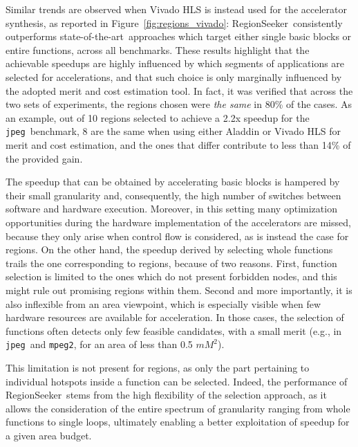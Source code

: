 \documentclass[]{usiinfthesis}
\newcommand{\rseeker}{{RegionSeeker}}
\newcommand{\SoTA}{{state-of-the-art}}
\newcommand{\jpeg}{\texttt{jpeg}}
\newcommand{\mpeg}{\texttt{mpeg2}}
\begin{document}
Similar trends are observed when Vivado HLS is instead used for the
accelerator synthesis, as reported in
Figure~\ref{fig:regions_vivado}: \rseeker\ consistently outperforms
\SoTA\ approaches which target either single basic blocks or
entire functions, across all benchmarks. These results 
highlight that the achievable speedups
are highly influenced by which segments of applications are selected
for accelerations, and that such choice is only marginally influenced
by the adopted merit and cost estimation tool. In fact, it was verified
that across the two sets of experiments, the regions chosen were
\emph{the same} in 80\% of the cases. As an example, out of 10 regions
selected to achieve a 2.2x speedup for the \jpeg\ benchmark, 8 are the
same when using either Aladdin or Vivado HLS for merit and cost
estimation, and the ones that differ contribute to less than 14\% of
the provided gain.\par

The speedup that can be obtained by accelerating basic blocks is
hampered by their small granularity and, consequently, the high number
of switches between software and hardware execution. Moreover, in this
setting many optimization opportunities
during the hardware implementation of the accelerators are missed,
because they only arise when control flow is considered, as is instead the case
for regions.
On the other hand, the speedup derived by selecting whole functions
trails the one corresponding to regions, because of two
reasons. First, function selection is limited to the ones which do not
present forbidden nodes, and this might rule out promising regions
within them. Second and more importantly, it is also inflexible from
an area viewpoint, which is especially visible when few hardware
resources are available for acceleration. In those cases, the
selection of functions often detects only few feasible candidates,
with a small merit (e.g., in \jpeg\ and \mpeg, for an area of less
than 0.5 $mM^2$).\par

This limitation is not present for regions, as only the part
pertaining to individual hotspots inside a function can be
selected. Indeed, the performance of \rseeker\ stems from the high
flexibility of the selection approach, as it allows the consideration of
the entire spectrum of granularity ranging from whole functions to
single loops, ultimately enabling a better exploitation of speedup for
a given area budget.
\end{document}
